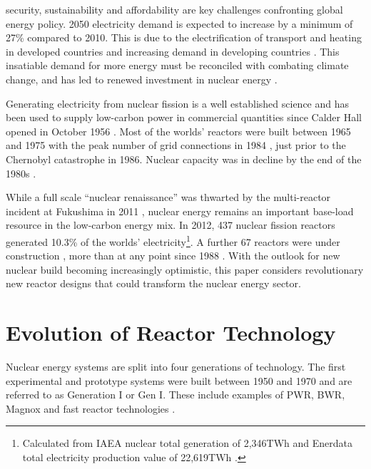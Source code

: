 \documentclass[journal]{IEEEtran}
\begin{document}
 security, sustainability and affordability are key challenges confronting global energy policy. 
2050 electricity demand is expected to increase by a minimum of 27\% compared to 2010. 
This is due to the electrification of transport and heating in developed countries and increasing demand in developing countries \cite{Kim201}.
This insatiable demand for more energy must be reconciled with combating climate change, and has led to renewed investment in nuclear energy \cite{schneider2012nuclear}.

Generating electricity from nuclear fission is a well established science and has been used to supply low-carbon power in commercial quantities since Calder Hall opened in October 1956 \cite{NDA2007}.
Most of the worlds' reactors were built between 1965 and 1975 with the peak number of grid connections in 1984 \cite{schneider2012nuclear}, just prior to the Chernobyl catastrophe in 1986.
Nuclear capacity was in decline by the end of the 1980s \cite{schneider2012nuclear}.

While a full scale ``nuclear renaissance'' was thwarted by the multi-reactor incident at Fukushima in 2011 \cite{Guidolin20121746}, nuclear energy remains an important base-load resource in the low-carbon energy mix. 
In 2012, 437 nuclear fission reactors generated 10.3\% of the worlds' electricity\footnote{Calculated from IAEA nuclear total generation \cite{IAEAReactors2013} of 2,346TWh and Enerdata total electricity production value of 22,619TWh \cite{Enerdata}.}. 
A further 67 reactors were under construction \cite{IAEAReactors2013}, more than at any point since 1988 \cite{schneider2012nuclear}.
With the outlook for new nuclear build becoming increasingly optimistic, this paper considers revolutionary new reactor designs that could transform the nuclear energy sector.

\section{Evolution of Reactor Technology}
Nuclear energy systems are split into four generations of technology. 
The first experimental and prototype systems were built between 1950 and 1970 \cite{GenIVRoadmap} and are referred to as Generation I or Gen I.
These include examples of PWR, BWR, Magnox and fast reactor technologies \cite{goldberg2011nuclear}\cite{Bhatnagar2011}. 
\end{document}
